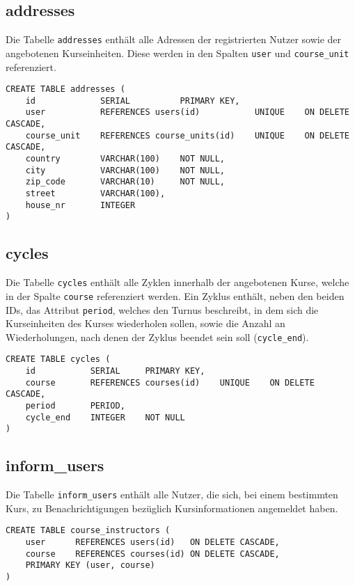 \subsection{addresses}
Die Tabelle \texttt{addresses} enthält alle Adressen der registrierten Nutzer sowie der angebotenen Kurseinheiten. Diese werden in den Spalten \texttt{user} und \texttt{course\_unit} referenziert.

\begin{verbatim}
CREATE TABLE addresses (
    id             SERIAL          PRIMARY KEY,
    user           REFERENCES users(id)           UNIQUE    ON DELETE CASCADE,
    course_unit    REFERENCES course_units(id)    UNIQUE    ON DELETE CASCADE,
    country        VARCHAR(100)    NOT NULL,
    city           VARCHAR(100)    NOT NULL,
    zip_code       VARCHAR(10)     NOT NULL,
    street         VARCHAR(100),
    house_nr       INTEGER
)
\end{verbatim}

\subsection{cycles}
Die Tabelle \texttt{cycles} enthält alle Zyklen innerhalb der angebotenen Kurse, welche in der Spalte \texttt{course} referenziert werden. Ein Zyklus enthält, neben den beiden IDs, das Attribut \texttt{period}, welches den Turnus beschreibt, in dem sich die Kurseinheiten des Kurses wiederholen sollen, sowie die Anzahl an Wiederholungen, nach denen der Zyklus beendet sein soll (\texttt{cycle\_end}).

\begin{verbatim}
CREATE TABLE cycles (
    id           SERIAL     PRIMARY KEY,
    course       REFERENCES courses(id)    UNIQUE    ON DELETE CASCADE,
    period       PERIOD,
    cycle_end    INTEGER    NOT NULL
)
\end{verbatim}

\subsection{inform\_users}
Die Tabelle \texttt{inform\_users} enthält alle Nutzer, die sich, bei einem bestimmten Kurs, zu Benachrichtigungen bezüglich Kursinformationen angemeldet haben.

\begin{verbatim}
CREATE TABLE course_instructors (
    user      REFERENCES users(id)   ON DELETE CASCADE,
    course    REFERENCES courses(id) ON DELETE CASCADE,
    PRIMARY KEY (user, course)
)
\end{verbatim}

